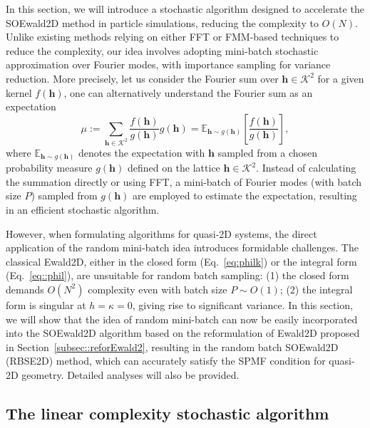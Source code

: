 In this section, we will introduce a stochastic algorithm designed to accelerate the SOEwald2D method in particle simulations, reducing the complexity to $O(N)$. 
Unlike existing methods relying on either FFT or FMM-based techniques to reduce the complexity, our idea involves adopting mini-batch stochastic approximation over Fourier modes, with importance sampling for variance reduction. 
More precisely, let us consider the Fourier sum over $\bm{h} \in \mathcal{K}^2$ for a given kernel $f(\bm{h})$,
one can alternatively understand the Fourier sum as an expectation
\begin{equation}
	\mu:=\sum_{\bm{h}\in\mathcal{K}^2}\frac{f(\bm{h})}{g(\bm{h})}g(\bm{h})=\mathbb{E}_{\bm h\sim g(\bm{h})}\left[\frac{f(\bm{h})}{g(\bm{h})}\right],
\end{equation}
where $\mathbb{E}_{\bm h \sim g(\bm{h})}$ denotes the expectation with $\bm{h}$ sampled from a chosen probability measure $g(\bm{h})$ defined on the lattice $\bm h \in \mathcal{K}^2$. 
Instead of calculating the summation directly or using FFT, a mini-batch of Fourier modes (with batch size $P$) sampled from $g(\bm{h})$ are employed to estimate the expectation, resulting in an efficient stochastic algorithm.

However, when formulating algorithms for quasi-2D systems, the direct application of the random mini-batch idea introduces formidable challenges.
The classical Ewald2D, either in the closed form (Eq.~\eqref{eq:philk}) or the integral form (Eq.~\eqref{eq::phil}), are unsuitable for random batch sampling:
(1) the closed form demands $O(N^2)$ complexity even with batch size $P \sim O(1)$; 
(2) the integral form is singular at $h = \kappa = 0$, giving rise to significant variance.
In this section, we will show that the idea of random mini-batch can now be easily incorporated into the SOEwald2D algorithm based on the reformulation of Ewald2D proposed in Section~\ref{subsec::reforEwald2}, resulting in the random batch SOEwald2D (RBSE2D) method, which can accurately satisfy the SPMF condition for quasi-2D geometry.
Detailed analyses will also be provided.

\subsection{The linear complexity stochastic algorithm} \label{subsec::rbis}

